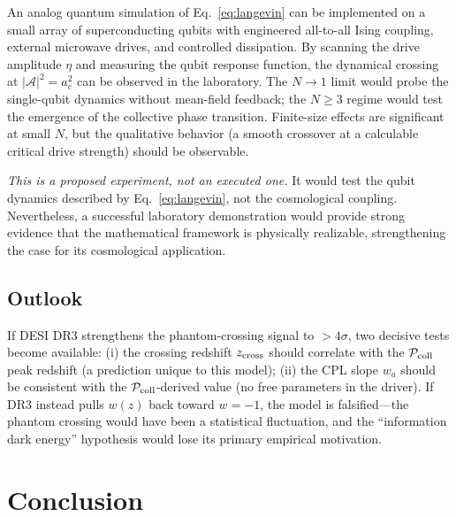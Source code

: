 \documentclass[aps,prd,twocolumn,superscriptaddress]{revtex4-2}
\begin{document}
An analog quantum simulation of Eq.~\eqref{eq:langevin} can be implemented on a small array of superconducting qubits with engineered all-to-all Ising coupling, external microwave drives, and controlled dissipation. By scanning the drive amplitude $\eta$ and measuring the qubit response function, the dynamical crossing at $|\mathcal{A}|^2 = a_c^2$ can be observed in the laboratory. The $N \to 1$ limit would probe the single-qubit dynamics without mean-field feedback; the $N \ge 3$ regime would test the emergence of the collective phase transition. Finite-size effects are significant at small $N$, but the qualitative behavior (a smooth crossover at a calculable critical drive strength) should be observable.

\emph{This is a proposed experiment, not an executed one.} It would test the qubit dynamics described by Eq.~\eqref{eq:langevin}, not the cosmological coupling. Nevertheless, a successful laboratory demonstration would provide strong evidence that the mathematical framework is physically realizable, strengthening the case for its cosmological application.

\subsection{Outlook}

If DESI DR3 strengthens the phantom-crossing signal to $>4\sigma$, two decisive tests become available: (i) the crossing redshift $z_{\rm cross}$ should correlate with the $\mathcal{P}_{\rm coll}$ peak redshift (a prediction unique to this model); (ii) the CPL slope $w_a$ should be consistent with the $\mathcal{P}_{\rm coll}$-derived value (no free parameters in the driver). If DR3 instead pulls $w(z)$ back toward $w=-1$, the model is falsified---the phantom crossing would have been a statistical fluctuation, and the ``information dark energy'' hypothesis would lose its primary empirical motivation.

\section{Conclusion}
\end{document}
